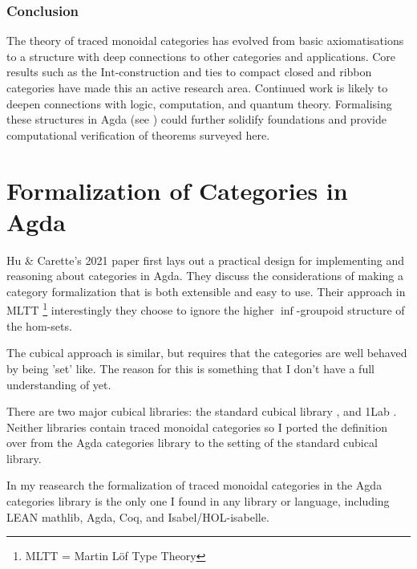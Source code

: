 \subsubsection*{Conclusion}
The theory of traced monoidal categories has evolved from basic axiomatisations
to a structure with deep connections to other categories and applications. Core
results such as the $\mathrm{Int}$-construction and ties to compact closed and
ribbon categories have made this an active research area. Continued work is
likely to deepen connections with logic, computation, and quantum theory.
Formalising these structures in Agda (see
\cite{hu2021-formalizing-category-theory}) could further solidify
foundations and provide computational verification of theorems
surveyed here.

\section{Formalization of Categories in Agda}

Hu & Carette's 2021 paper \cite{hu2021-formalizing-category-theory}
first lays out a practical design for implementing and reasoning about
categories in Agda. They discuss the considerations of making a
category formalization that is both extensible and easy to use. Their
approach in MLTT \footnote{MLTT = Martin L{\"o}f Type Theory}
\cite{martin-lof1984-mltt} interestingly they choose to ignore the
higher $\inf$-groupoid structure
\cite{maltsiniotis2010-grothendieck-inf-groupoids} of the hom-sets.

The cubical approach \cite{vezzosi2021-cubical-agda-dependently} is
similar, but requires that the categories are well behaved by being
'set' like. The reason for this is something that I don't have a full
understanding of yet.

There are two major cubical libraries: the standard cubical library
\cite{cubical-agda-lib}, and 1Lab \cite{1lab}. Neither libraries
contain traced monoidal categories so I ported the definition over
from the Agda categories library\cite{agda-categories,hu2021-formalizing-category-theory} to the setting of the standard cubical library.

In my reasearch the formalization of traced monoidal categories in the
Agda categories library is the only one I found in any library or
language, including LEAN mathlib\cite{mathlib2020},
Agda\cite{norell2009-dependently-typed-programming},
Coq\cite{team2021-coq-proof-assistant}, and
Isabel/HOL-isabelle.
